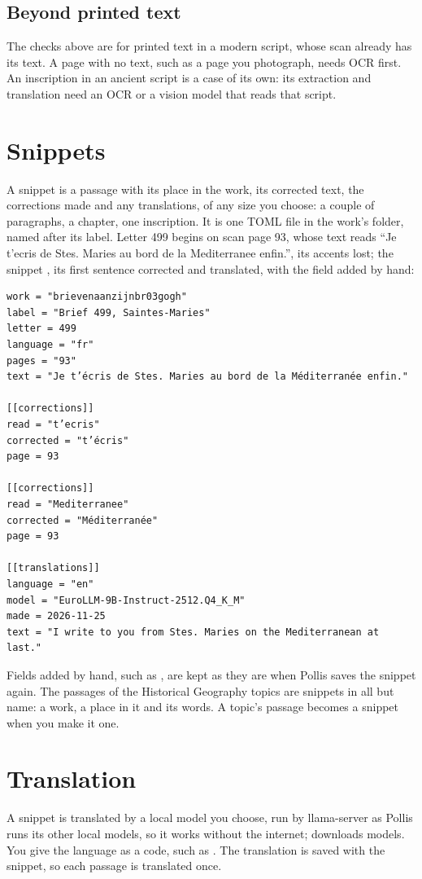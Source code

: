 \subsection{Beyond printed text}
The checks above are for printed text in a modern script, whose scan already has its text. A page with no text, such
as a page you photograph, needs OCR first. An inscription in an ancient script is a case of its own: its extraction
and translation need an OCR or a vision model that reads that script.

\section{Snippets}\label{sec:snippets}
A snippet is a passage with its place in the work, its corrected text, the corrections made and any translations, of
any size you choose: a couple of paragraphs, a chapter, one inscription. It is one TOML file in the work's
 folder, named after its label. Letter 499 begins on scan page 93, whose text reads ``Je t’ecris de Stes.
Maries au bord de la Mediterranee enfin.'', its accents lost; the snippet , its
first sentence corrected and translated, with the field  added by hand:
\begin{lstlisting}
work = "brievenaanzijnbr03gogh"
label = "Brief 499, Saintes-Maries"
letter = 499
language = "fr"
pages = "93"
text = "Je t’écris de Stes. Maries au bord de la Méditerranée enfin."

[[corrections]]
read = "t’ecris"
corrected = "t’écris"
page = 93

[[corrections]]
read = "Mediterranee"
corrected = "Méditerranée"
page = 93

[[translations]]
language = "en"
model = "EuroLLM-9B-Instruct-2512.Q4_K_M"
made = 2026-11-25
text = "I write to you from Stes. Maries on the Mediterranean at last."
\end{lstlisting}
Fields added by hand, such as , are kept as they are when Pollis saves the snippet again.
The passages of the Historical Geography topics are snippets in all but name: a work, a place in it and its words. A
topic's passage becomes a snippet when you make it one.

\section{Translation}\label{sec:translation}
A snippet is translated by a local model you choose, run by llama-server as Pollis runs its other local models, so it
works without the internet; \gt{} downloads models. You give the language as a code, such
as . The translation is saved with the snippet, so each passage is translated once.

